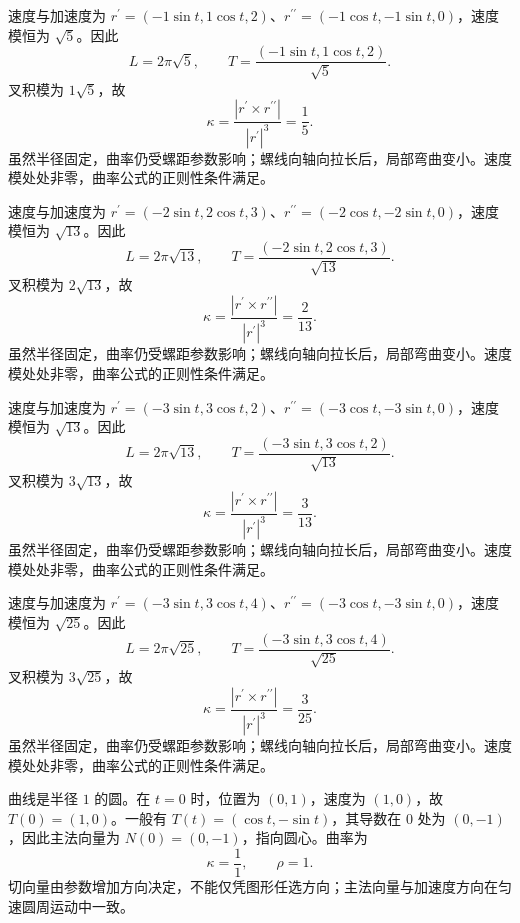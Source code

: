 \documentclass[UTF8,12pt,a4paper,fontset=fandol]{ctexart}
\begin{document}
\begin{solve}\label{ans:c31q15}
速度与加速度为 $r^{\prime}=(-1\sin t,1\cos t,2)$、$r^{\prime\prime}=(-1\cos t,-1\sin t,0)$，速度模恒为 $\sqrt{5}$。因此
\[
L=2\pi\sqrt{5},\qquad T=\frac{(-1\sin t,1\cos t,2)}{\sqrt{5}}.
\]
叉积模为 $1\sqrt{5}$，故
\[
\kappa=\frac{|r^{\prime}\times r^{\prime\prime}|}{|r^{\prime}|^3}=\frac{1}{5}.
\]
虽然半径固定，曲率仍受螺距参数影响；螺线向轴向拉长后，局部弯曲变小。速度模处处非零，曲率公式的正则性条件满足。
\end{solve}

\begin{solve}\label{ans:c31q16}
速度与加速度为 $r^{\prime}=(-2\sin t,2\cos t,3)$、$r^{\prime\prime}=(-2\cos t,-2\sin t,0)$，速度模恒为 $\sqrt{13}$。因此
\[
L=2\pi\sqrt{13},\qquad T=\frac{(-2\sin t,2\cos t,3)}{\sqrt{13}}.
\]
叉积模为 $2\sqrt{13}$，故
\[
\kappa=\frac{|r^{\prime}\times r^{\prime\prime}|}{|r^{\prime}|^3}=\frac{2}{13}.
\]
虽然半径固定，曲率仍受螺距参数影响；螺线向轴向拉长后，局部弯曲变小。速度模处处非零，曲率公式的正则性条件满足。
\end{solve}

\begin{solve}\label{ans:c31q17}
速度与加速度为 $r^{\prime}=(-3\sin t,3\cos t,2)$、$r^{\prime\prime}=(-3\cos t,-3\sin t,0)$，速度模恒为 $\sqrt{13}$。因此
\[
L=2\pi\sqrt{13},\qquad T=\frac{(-3\sin t,3\cos t,2)}{\sqrt{13}}.
\]
叉积模为 $3\sqrt{13}$，故
\[
\kappa=\frac{|r^{\prime}\times r^{\prime\prime}|}{|r^{\prime}|^3}=\frac{3}{13}.
\]
虽然半径固定，曲率仍受螺距参数影响；螺线向轴向拉长后，局部弯曲变小。速度模处处非零，曲率公式的正则性条件满足。
\end{solve}

\begin{solve}\label{ans:c31q18}
速度与加速度为 $r^{\prime}=(-3\sin t,3\cos t,4)$、$r^{\prime\prime}=(-3\cos t,-3\sin t,0)$，速度模恒为 $\sqrt{25}$。因此
\[
L=2\pi\sqrt{25},\qquad T=\frac{(-3\sin t,3\cos t,4)}{\sqrt{25}}.
\]
叉积模为 $3\sqrt{25}$，故
\[
\kappa=\frac{|r^{\prime}\times r^{\prime\prime}|}{|r^{\prime}|^3}=\frac{3}{25}.
\]
虽然半径固定，曲率仍受螺距参数影响；螺线向轴向拉长后，局部弯曲变小。速度模处处非零，曲率公式的正则性条件满足。
\end{solve}

\begin{solve}\label{ans:c31q19}
曲线是半径 $1$ 的圆。在 $t=0$ 时，位置为 $(0,1)$，速度为 $(1,0)$，故 $T(0)=(1,0)$。一般有 $T(t)=(\cos t,-\sin t)$，其导数在 $0$ 处为 $(0,-1)$，因此主法向量为 $N(0)=(0,-1)$，指向圆心。曲率为
\[
\kappa=\frac1{1},\qquad\rho=1.
\]
切向量由参数增加方向决定，不能仅凭图形任选方向；主法向量与加速度方向在匀速圆周运动中一致。
\end{solve}
\end{document}
